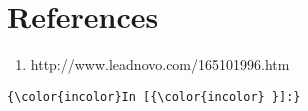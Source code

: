 \documentclass{article}
\providecommand{\tightlist}{%
      \setlength{\itemsep}{0pt}\setlength{\parskip}{0pt}}
\begin{document}
    \section{\texorpdfstring{\textbf{References}}{References}}\label{references}

\begin{enumerate}
\def\labelenumi{\arabic{enumi}.}
\tightlist
\item
  http://www.leadnovo.com/165101996.htm
\end{enumerate}

    \begin{Verbatim}[commandchars=\\\{\}]
{\color{incolor}In [{\color{incolor} }]:} 
\end{Verbatim}


    
    
    
    
\end{document}
